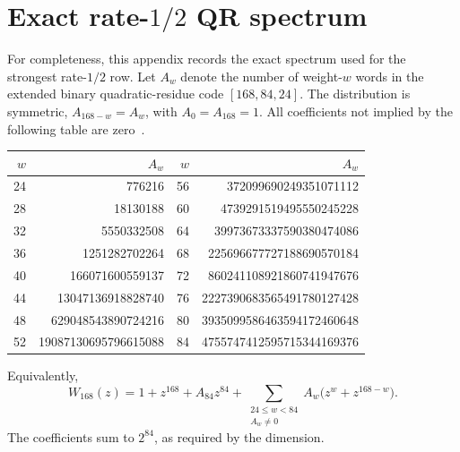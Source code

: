 \documentclass[runningheads,envcountsame,envcountsect]{llncs}
\begin{document}
\section{Exact rate-$1/2$ QR spectrum}
\label{app:qr-spectrum}

For completeness, this appendix records the exact spectrum used for the
strongest rate-$1/2$ row.  Let $A_w$ denote the number of weight-$w$ words in
the extended binary quadratic-residue code $[168,84,24]$.  The distribution is
symmetric, $A_{168-w}=A_w$, with $A_0=A_{168}=1$.  All coefficients not implied
by the following table are zero~\cite{su08}.

\begin{center}
\small
\begin{tabular}{@{}r@{\quad}r@{\qquad}r@{\quad}r@{}}
\toprule
$w$ & $A_w$ & $w$ & $A_w$ \\
\midrule
24 & 776216                 & 56 & 372099690249351071112 \\
28 & 18130188               & 60 & 4739291519495550245228 \\
32 & 5550332508             & 64 & 39973673337590380474086 \\
36 & 1251282702264          & 68 & 225696677727188690570184 \\
40 & 166071600559137        & 72 & 860241108921860741947676 \\
44 & 13047136918828740      & 76 & 2227390683565491780127428 \\
48 & 629048543890724216     & 80 & 3935099586463594172460648 \\
52 & 19087130695796615088   & 84 & 4755747412595715344169376 \\
\bottomrule
\end{tabular}
\end{center}

Equivalently,
\[
  W_{168}(z)=1+z^{168}+A_{84}z^{84}
  +\sum_{\substack{24\le w<84\\A_w\ne0}}
       A_w\bigl(z^w+z^{168-w}\bigr).
\]
The coefficients sum to $2^{84}$, as required by the dimension.




\end{document}
